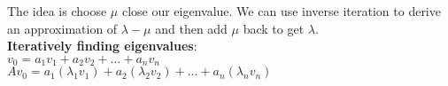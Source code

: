 \documentclass[12pt, AMS Euler]{article}
\begin{document}
The idea is choose $\mu$ close our eigenvalue. We can use inverse iteration to derive an approximation of $\lambda - \mu$ and then add $\mu$ back to get $\lambda$.\\

\textbf{Iteratively finding eigenvalues}:\\

$v_0 = a_1 v_1 + a_2 v_2 + ... + a_n v_n$\\

$Av_0 = a_1(\lambda_1 v_1) + a_2 (\lambda_2 v_2) + ... + a_n (\lambda_n v_n)$\\
\noindent \underline{\hspace{3in}}\\
\end{document}
